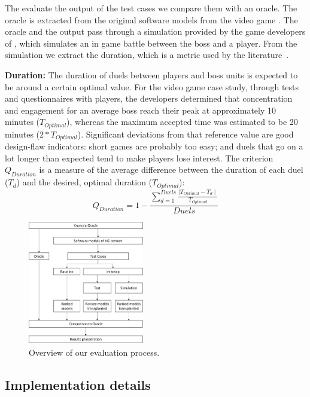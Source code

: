 The evaluate the output of the test cases we compare them with an oracle. The oracle is extracted from the original software models from the video game \CaseStudy{}. The oracle and the output pass through a simulation provided by the game developers of \CaseStudy{}, which simulates an in game battle between the boss and a player. From the simulation we extract the duration, which is a metric used by the literature~\cite{browne2010evolutionary}.

{\bf Duration:} The duration of duels between players and boss units is expected to be around a certain optimal value. For the video game case study, through tests and questionnaires with players, the developers determined that concentration and engagement for an average boss reach their peak at approximately 10 minutes ($T_{Optimal}$), whereas the maximum accepted time was estimated to be 20 minutes ($2*T_{Optimal}$). Significant deviations from that reference value are good design-flaw indicators: short games are probably too easy; and duels that go on a lot longer than expected tend to make players lose interest. The criterion $Q_{Duration}$ is a measure of the average difference between the duration of each duel ($T_{d}$) and the desired, optimal duration ($T_{Optimal}$):
\begin{equation}
Q_{Duration} =  1 - \frac{\sum\limits_{d=1}^{Duels}\frac{\mid T_{Optimal} - T_{d} \mid}{T_{Optimal}}}{Duels} 
\end{equation}

\begin{figure}[h]
    \centering
    \includegraphics[width=0.45\textwidth]{Figures/evaluation_process.png}
    \caption{Overview of our evaluation process.}
    \label{fig:evaluation}
\end{figure}

\subsection{Implementation details}

